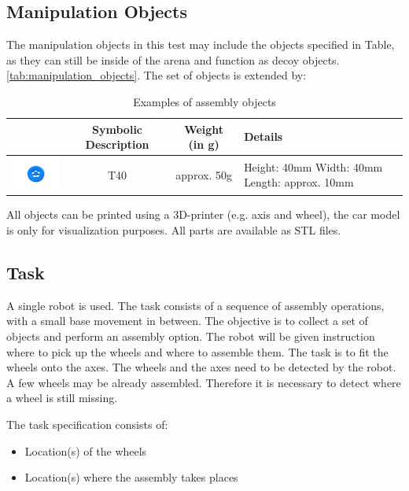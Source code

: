 \subsection{Manipulation Objects}
The manipulation objects in this test may include the objects specified in Table, as they can still be inside of the arena and function as decoy objects. \ref{tab:manipulation_objects}.
The set of objects is extended by:

\begin{table}[p]
\begin{tabular}{|c|c|c|p{5cm}|}
\hline 
 & Symbolic Description & Weight (in g) & Details \\ 
\hline 
\includegraphics[width=3cm]{./images/BAT_Tire.png}  & T40 & approx. 50g & Height: 40mm \newline
 Width: 40mm \newline
 Length: approx. 10mm \\ 
\hline 
\end{tabular} 

\label{tab:bat_objects}
\caption{Examples of assembly objects}
\end{table}

All objects can be printed using a 3D-printer (e.g. axis and wheel), the car model is only for visualization purposes. All parts are available as STL files.

\subsection{Task}
A single robot is used. The task consists of a sequence of assembly operations, with a small base movement in between. The objective is to collect a set of objects and perform an assembly option. The robot will be given instruction where to pick up the wheels and where to assemble them. The task is to fit the wheels onto the axes. The wheels and the axes need to be detected by the robot. A few wheels may be already assembled. Therefore it is necessary to detect where a wheel is still missing.

\par
The task specification consists of: 
\begin{itemize}
	\item Location(s) of the wheels
	\item Location(s) where the assembly takes places
\end{itemize}

